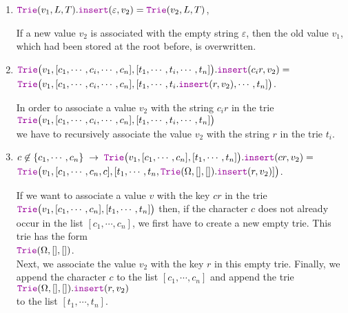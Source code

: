 \begin{enumerate}
\item $\mytt{Trie}(v_1,L,T).\mytt{insert}(\varepsilon, v_2) = \mytt{Trie}(v_2,L,T)$,
  
      If a new value $v_2$ is associated with the empty string $\varepsilon$, then the old value
      $v_1$, which had been stored at the root before, is overwritten.
\item $\mytt{Trie}\bigl(v_1,[c_1,\cdots,c_i,\cdots,c_n], [t_1,\cdots,t_i,\cdots,t_n]\bigr).\mytt{insert}(c_ir,v_2) =$ \\[0.2cm]
      \hspace*{1.3cm}  
      $\mytt{Trie}\bigl(v_1,[c_1,\cdots,c_i,\cdots,c_n], [t_1,\cdots,t_i.\mytt{insert}(r,v_2),\cdots,t_n]\bigr)$.

      In order to associate a value $v_2$ with the string $c_ir$ in the trie
      \\[0.2cm]
      \hspace*{1.3cm}
      $\mytt{Trie}\bigl(v_1,[c_1,\cdots,c_i,\cdots,c_n], [t_1,\cdots,t_i,\cdots,t_n]\bigr)$ 
      \\[0.2cm]
      we have to recursively associate the value $v_2$ with the string $r$ in the trie $t_i$.
\item $c \not\in\{c_1,\cdots,c_n\} \;\rightarrow\;\mytt{Trie}\bigl(v_1,[c_1,\cdots,c_n], [t_1,\cdots,t_n]\bigr).\mytt{insert}(cr,v_2) =$ \\[0.2cm]
      \hspace*{1.3cm}  
      $\mytt{Trie}\bigl(v_1,[c_1,\cdots,c_n,c], [t_1,\cdots,t_n,\mytt{Trie}(\Omega,[],[]).\mytt{insert}(r,v_2)]\bigr)$.
      
      If we want to associate a value $v$ with the key $cr$ in the trie
      $\mytt{Trie}\bigl(v_1,[c_1,\cdots,c_n], [t_1,\cdots,t_n]\bigr)$ then, if the character $c$
      does not already occur in the list $[c_1,\cdots,c_n]$, we first have to create a new empty trie.
      This trie has the form \\[0.2cm]
      \hspace*{1.3cm} $\mytt{Trie}(\Omega, [], [])$. \\[0.2cm]
      Next, we associate the value $v_2$ with the key $r$ in this empty trie.  Finally,
      we append the character $c$ to the list $[c_1,\cdots,c_n]$ and append the trie
        \\[0.2cm] 
      \hspace*{1.3cm}
      $\mytt{Trie}(\Omega, [], []).\mytt{insert}(r,v_2)$ 
      \\[0.2cm]
      to the list $[t_1,\cdots,t_n]$.
\end{enumerate}

